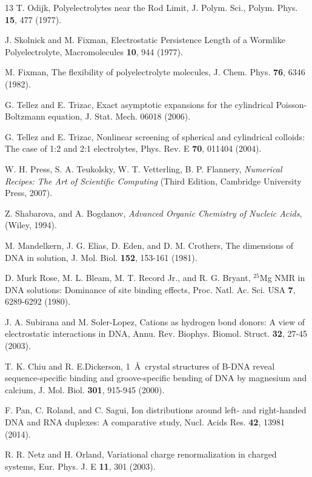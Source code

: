 \documentclass[aps,pre,twocolumn]{revtex4}
\begin{document}
\begin{thebibliography}{13}
T. Odijk, Polyelectrolytes near the Rod Limit, {J. Polym. Sci., Polym. Phys.} \textbf{15}, 477 (1977). 

J. Skolnick and M. Fixman, Electrostatic Persistence Length of a Wormlike Polyelectrolyte, {Macromolecules} \textbf{10}, 944 (1977).

M. Fixman, The flexibility of polyelectrolyte molecules, {J. Chem. Phys.} \textbf{76}, 6346 (1982).

G. Tellez and  E. Trizac, Exact asymptotic expansions for the cylindrical Poisson-Boltzmann equation, J. Stat. Mech. 06018 (2006).

G. Tellez and  E. Trizac, Nonlinear screening of spherical and cylindrical colloids: The case of 1:2 and 2:1 electrolytes, {Phys. Rev. E} \textbf{70}, 011404 (2004).

W. H. Press, S. A. Teukolsky, W. T. Vetterling, B. P. Flannery, \textit{Numerical Recipes: The Art of Scientific Computing} (Third Edition, Cambridge University Press, 2007).

Z. Shabarova, and A. Bogdanov, {\it Advanced Organic Chemistry of Nucleic Acids}, (Wiley, 1994).

M. Mandelkern, J. G. Elias, D. Eden, and D. M. Crothers, The dimensions of DNA in solution, J. Mol. Biol. \textbf{152}, 153-161 (1981).

D. Murk Rose, M. L. Bleam, M. T. Record Jr., and R. G. Bryant, $^{25}$Mg NMR in DNA solutions: Dominance of site binding effects, {Proc. Natl. Ac. Sci. USA} \textbf{7}, 6289-6292 (1980).

J. A. Subirana and M. Soler-Lopez, Cations as hydrogen bond donors: A view of electrostatic interactions in DNA, {Annu. Rev. Biophys.  Biomol. Struct.} \textbf{32}, 27-45 (2003).

T. K. Chiu and R. E.Dickerson, 1~\AA~crystal structures of B-DNA reveal sequence-specific binding and groove-specific bending of DNA by magnesium and calcium, {J. Mol. Biol.} \textbf{301}, 915-945 (2000).

F. Pan, C. Roland, and C. Sagui, Ion distributions around left- and right-handed DNA and RNA duplexes: A comparative study, {Nucl. Acids Res.} \textbf{42}, 13981 (2014).

 R. R. Netz and H. Orland, Variational charge renormalization in charged systems, Eur. Phys. J. E {\bf 11}, 301 (2003).

\end{thebibliography}
\end{document}
